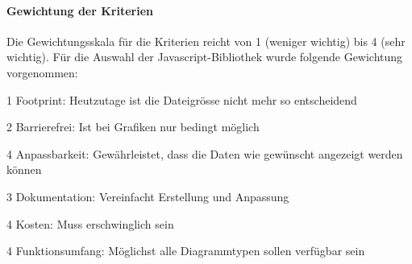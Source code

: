 \paragraph*{Gewichtung der Kriterien}
Die Gewichtungsskala für die Kriterien reicht von 1 (weniger wichtig) bis 4 (sehr wichtig). Für die Auswahl der Javascript-Bibliothek wurde folgende Gewichtung vorgenommen:
\begin{itemize*}
\item 1 Footprint: Heutzutage ist die Dateigrösse nicht mehr so entscheidend
\item 2 Barrierefrei: Ist bei Grafiken nur bedingt möglich
\item 4 Anpassbarkeit: Gewährleistet, dass die Daten wie gewünscht angezeigt werden können
\item 3 Dokumentation: Vereinfacht Erstellung und Anpassung
\item 4 Kosten: Muss erschwinglich sein
\item 4 Funktionsumfang: Möglichst alle Diagrammtypen sollen verfügbar sein
\end{itemize*}


